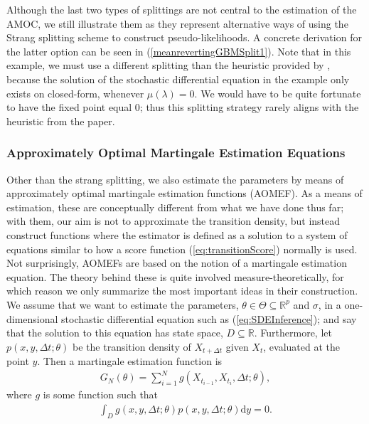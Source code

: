 Although the last two types of splittings are not central to the estimation of the AMOC, we still illustrate them as they represent alternative ways of using the Strang splitting scheme to construct pseudo-likelihoods. A concrete derivation for the latter option can be seen in (\ref{meanrevertingGBMSplit1}). Note that in this example, we must use a different splitting than the heuristic provided by \cite[section 2.3 and 2.5]{SplittingSchemes}, because the solution of the stochastic differential equation in the example only exists on closed-form, whenever $\mu(\lambda) = 0$. We would have to be quite fortunate to have the fixed point equal 0; thus this splitting strategy rarely aligns with the heuristic from the paper.
\subsubsection{Approximately Optimal Martingale Estimation Equations}\label{subsubsec:approximatelyOptimalMartingaleEstimationEquation}
Other than the strang splitting, we also estimate the parameters by means of approximately optimal martingale estimation functions (AOMEF). As a means of estimation, these are conceptually different from what we have done thus far; with them, our aim is not to approximate the transition density, but instead construct functions where the estimator is defined as a solution to a system of equations similar to how a score function (\ref{eq:transitionScore}) normally is used. Not surprisingly, AOMEFs are based on the notion of a martingale estimation equation. The theory behind these is quite involved measure-theoretically, for which reason we only summarize the most important ideas in their construction. We assume that we want to estimate the parameters, $\theta\in \Theta \subseteq \mathbb{R}^p$ and $\sigma$, in a one-dimensional stochastic differential equation such as (\ref{eq:SDEInference}); and say that the solution to this equation has state space, $D\subseteq \mathbb{R}$. Furthermore, let $p(x, y, \Delta t; \theta)$ be the transition density of $X_{t+\Delta t}$ given $X_t$, evaluated at the point $y$. Then a martingale estimation function is 
\begin{align}
    G_N(\theta) = \sum_{i = 1}^N g(X_{t_{i - 1}}, X_{t_i}, \Delta t; \theta), \label{eq:estimationEquation}
\end{align}
where $g$ is some function such that
\begin{align}
    \int_{D} g(x, y, \Delta t; \theta)p(x, y, \Delta t; \theta)\mathrm{d}y = 0. \label{eq:martingaleProperty}
\end{align}
